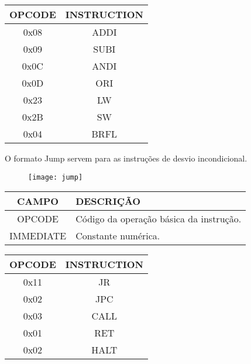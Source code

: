 \begin{table}[H]
\centering	
\begin{tabular}{|c|c|}
	\hline 
  	\cellcolor[gray]{0.9}\textbf{OPCODE} & \cellcolor[gray]{0.9}\textbf{INSTRUCTION} \\ 
	\hline 
	0x08 & ADDI \\ 
	\hline 
	0x09 & SUBI \\ 
	\hline 
	0x0C & ANDI \\ 
	\hline 
	0x0D & ORI \\ 
	\hline
	0x23 & LW \\ 
	\hline 
	0x2B & SW \\
	\hline
	0x04 & BRFL \\ 
  	\hline 
	\end{tabular} 
\end{table}	
	
 O formato Jump servem para as instruções de desvio incondicional.  	
   	\begin{figure}[H]
    	\centering
    	\texttt{[image: jump]}
		\label{jump}
  	\end{figure}
  	
\begin{table}[H]
\centering	
\begin{tabular}{|c|l|}
	\hline 
	\cellcolor[gray]{0.9}\textbf{CAMPO} & \cellcolor[gray]{0.9}\textbf{DESCRIÇÃO} \\ 
	\hline 
	OPCODE & Código da operação básica da instrução. \\ 
	\hline 
	IMMEDIATE & Constante numérica. \\ 
	\hline 
	\end{tabular} 
	\end{table}
 
\begin{table}[H]
\centering 	
  	\begin{tabular}{|c|c|}
  	\hline 
  	\cellcolor[gray]{0.9}\textbf{OPCODE} & \cellcolor[gray]{0.9}\textbf{INSTRUCTION} \\ 
  	\hline 
  	0x11 & JR \\ 
  	\hline 
  	0x02 & JPC \\ 
  	\hline 
  	0x03 & CALL \\ 
  	\hline 
  	0x01 & RET \\ 
  	\hline 
  	0x02 & HALT \\ 
  	\hline 
  	\end{tabular} 
\end{table}